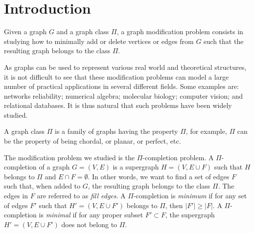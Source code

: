 \documentclass[12pt]{book}
\theoremstyle{plain}
\theoremstyle{remark}
\begin{document}
%
\chapter{Introduction}

Given a graph $G$ and a graph class $\Pi$, a graph modification problem consists in studying how to minimally add or delete vertices or edges from $G$ such that the resulting graph belongs to the class $\Pi$.

As graphs can be used to represent various real world and theoretical structures, it is not difficult to see that these modification problems can model a large number of practical applications in several different fields. Some examples are: networks reliability; numerical algebra; molecular biology; computer vision; and relational databases. It is thus natural that such problems have been widely studied.

A graph class $\Pi$ is a family of graphs having the property $\Pi$, for example, $\Pi$ can be the property of being chordal, or planar, or perfect, etc.


The modification problem we studied is the $\Pi$-completion problem. 
A $\Pi$-completion of a graph $G=(V,E)$ is a supergraph $H = (V, E \cup F)$ such that $H$ belongs to $\Pi$ and $E \cap F = \emptyset$. In other words, we want to find a set of edges $F$ such that, when added to $G$, the resulting graph belongs to the class $\Pi$. The edges in $F$ are referred to as \emph{fill edges}.
A $\Pi$-completion is \emph{minimum }if for any set of edges $F'$ such that $H'= (V, E \cup F')$ belongs to $\Pi$, then $|F'| \geq |F|$. A $\Pi$-completion is \emph{minimal }if for any proper subset $F' \subset F$, the supergraph $H'= (V, E \cup F')$ does not belong to $\Pi$. 

\end{document}
